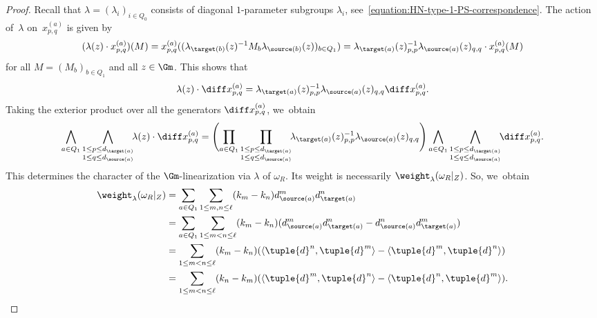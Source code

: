 \begin{proof}
Recall that $\lambda = (\lambda_i)_{i \in Q_0}$ consists of diagonal $1$-parameter subgroups $\lambda_i$,
see~\eqref{equation:HN-type-1-PS-correspondence}.
The action of~$\lambda$ on~$x_{p,q}^{(a)}$ is given by
\begin{equation*}
(\lambda(z) \cdot x_{p,q}^{(a)})(M) = x_{p,q}^{(a)}((\lambda_{\target(b)}(z)^{-1}M_b\lambda_{\source(b)}(z))_{b \in Q_1})
= \lambda_{\target(a)}(z)_{p,p}^{-1}\lambda_{\source(a)}(z)_{q,q}\cdot x_{p,q}^{(a)}(M)
\end{equation*}
for all $M = (M_b)_{b \in Q_1}$ and all $z \in \Gm$.
This shows that
\begin{equation*}
\lambda(z)\cdot \diff x_{p,q}^{(a)} = \lambda_{\target(a)}(z)_{p,p}^{-1}\lambda_{\source(a)}(z)_{q,q} \diff x_{p,q}^{(a)}.
\end{equation*}
Taking the exterior product over all the generators $\diff x_{p,q}^{(a)}$, we~obtain
\begin{equation*}
\bigwedge_{a \in Q_1}\bigwedge_{\substack{1 \leq p \leq d_{\target(a)} \\ 1 \leq q \leq d_{\source(a)}}} \!\! \lambda(z)\cdot \diff x_{p,q}^{(a)}
= \Biggl( \prod_{a \in Q_1} \prod_{\substack{1 \leq p \leq d_{\target(a)} \\ 1 \leq q \leq d_{\source(a)}}} \!\! \lambda_{\target(a)}(z)_{p,p}^{-1}\lambda_{\source(a)}(z)_{q,q} \Biggr) \bigwedge_{a \in Q_1} \bigwedge_{\substack{1 \leq p \leq d_{\target(a)} \\ 1 \leq q \leq d_{\source(a)}}} \!\!\diff x_{p,q}^{(a)}.
\end{equation*}
This determines the character of the $\Gm$-linearization via $\lambda$ of $\omega_R$.
Its weight is necessarily $\weight_\lambda(\omega_R|_Z)$. So, we~obtain
\begin{align*}
\weight_\lambda(\omega_R|_Z)
&= \sum_{a \in Q_1} \sum_{1 \leq m,n \leq \ell} (k_m - k_n) d_{\source(a)}^m d_{\target(a)}^n \\
&= \sum_{a \in Q_1} \sum_{1 \leq m < n \leq \ell}(k_m - k_n)(d_{\source(a)}^m d_{\target(a)}^n - d_{\source(a)}^n d_{\target(a)}^m) \\
&= \sum_{1 \leq m < n \leq \ell}(k_m - k_n)(\langle \tuple{d}^n,\tuple{d}^m \rangle - \langle \tuple{d}^m,\tuple{d}^n \rangle) \\
&= \sum_{1 \leq m < n \leq \ell}(k_n - k_m)(\langle \tuple{d}^m,\tuple{d}^n \rangle - \langle \tuple{d}^n,\tuple{d}^m \rangle).\qedhere
\end{align*}
\end{proof}

